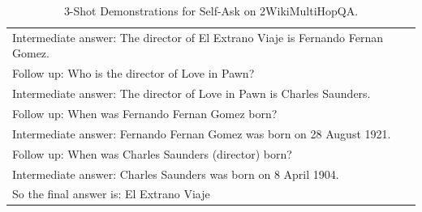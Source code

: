 \begin{table}[t!]
{\begin{tabular}{p{\textwidth}}
Intermediate answer: The director of El Extrano Viaje is Fernando Fernan Gomez.\\
Follow up: Who is the director of Love in Pawn?\\
Intermediate answer: The director of Love in Pawn is Charles Saunders.\\
Follow up: When was Fernando Fernan Gomez born?\\
Intermediate answer: Fernando Fernan Gomez was born on 28 August 1921.\\
Follow up: When was Charles Saunders (director) born?\\
Intermediate answer: Charles Saunders was born on 8 April 1904.\\
So the final answer is: El Extrano Viaje\\
\bottomrule
\end{tabular}
}
\caption{3-Shot Demonstrations for Self-Ask on 2WikiMultiHopQA.}\label{tab:2WikiMultiHopQA-self-ask}
\end{table}
\endgroup

